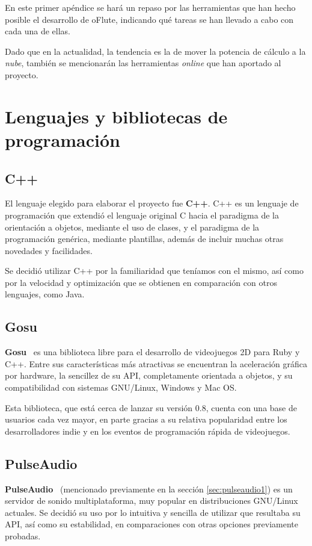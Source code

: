 En este primer apéndice se hará un repaso por las herramientas que han hecho
posible el desarrollo de oFlute, indicando qué tareas se han llevado a cabo con
cada una de ellas.

Dado que en la actualidad, la tendencia es la de mover la potencia de cálculo a
la \textit{nube}, también se mencionarán las herramientas \textit{online} que
han aportado al proyecto.

\section{Lenguajes y bibliotecas de programación}

\subsection{C++}
El lenguaje elegido para elaborar el proyecto fue \textbf{C++}. C++ es un
lenguaje de programación que extendió el lenguaje original C hacia el paradigma
de la orientación a objetos, mediante el uso de clases, y el paradigma de la
programación genérica, mediante plantillas, además de incluir muchas otras
novedades y facilidades.

Se decidió utilizar C++ por la familiaridad que teníamos con el mismo, así como
por la velocidad y optimización que se obtienen en comparación con otros
lenguajes, como Java.

\subsection{Gosu}
\textbf{Gosu}~\cite{gosu} es una biblioteca libre para el desarrollo de
videojuegos 2D para Ruby y C++. Entre sus características más atractivas se
encuentran la aceleración gráfica por hardware, la sencillez de su API,
completamente orientada a objetos, y su compatibilidad con sistemas GNU/Linux,
Windows y Mac OS.

Esta biblioteca, que está cerca de lanzar su versión 0.8, cuenta con una base de
usuarios cada vez mayor, en parte gracias a su relativa popularidad entre los
desarrolladores indie y en los eventos de programación rápida de videojuegos.

\subsection{PulseAudio}
\textbf{PulseAudio}~\cite{pulseaudio} (mencionado previamente en la sección
\ref{sec:pulseaudio1}) es un servidor de sonido multiplataforma, muy popular en
distribuciones GNU/Linux actuales. Se decidió su uso por lo intuitiva y sencilla
de utilizar que resultaba su API, así como su estabilidad, en comparaciones con
otras opciones previamente probadas.

